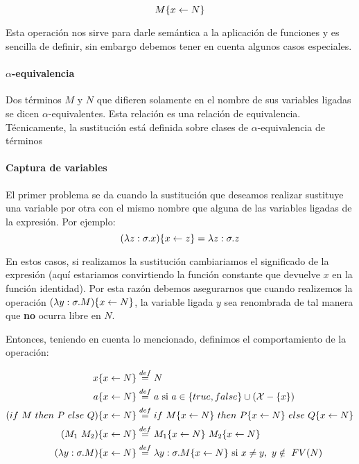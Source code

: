$$M\{x\leftarrow N\}$$

Esta operación nos sirve para darle semántica a la aplicación de funciones y es sencilla de definir, sin embargo debemos tener en cuenta algunos casos especiales.

\paragraph{$\alpha$-equivalencia} Dos términos $M$ y $N$ que difieren solamente en el nombre de sus variables ligadas se dicen $\alpha$-equivalentes. Esta relación es una relación de equivalencia. Técnicamente, la sustitución está definida sobre clases de $\alpha$-equivalencia de términos


\paragraph{Captura de variables}\label{calculo_lambda:captura_variables} El primer problema se da cuando la sustitución que deseamos realizar sustituye una variable por otra con el mismo nombre que alguna de las variables ligadas de la expresión. Por ejemplo:
$$(\lambda z: \sigma . x)\{x\leftarrow z\} = \lambda z: \sigma . z$$

En estos casos, si realizamos la sustitución cambiariamos el significado de la expresión (aquí estariamos convirtiendo la función constante que devuelve $x$ en la función identidad). Por esta razón debemos asegurarnos que cuando realizemos la operación $(\lambda y: \sigma . M)\{x\leftarrow N\}$, la variable ligada $y$ sea renombrada de tal manera que \textbf{no} ocurra libre en $N$.

\vspace*{5mm}
Entonces, teniendo en cuenta lo mencionado, definimos el comportamiento de la operación:

\begin{equation*}
	\begin{split}
		x\{x\leftarrow N\} &\overset{def}{=} N \\
		a\{x\leftarrow N\} &\overset{def}{=} a \text{ si } a \in \{true,false\}\cup(\mathcal{X}-\{x\}) \\
		(if~ M~ then~ P~ else~ Q)\{x\leftarrow N\} &\overset{def}{=} if~ M\{x\leftarrow N\}~ then~ P\{x\leftarrow N\}~ else~ Q\{x\leftarrow N\}\\
		(M_1~M_2)\{x\leftarrow N\} &\overset{def}{=} M_1\{x\leftarrow N\}~M_2\{x\leftarrow N\}\\
		(\lambda y: \sigma . M)\{x\leftarrow N\} &\overset{def}{=} \lambda y: \sigma . M\{x\leftarrow N\}~\text{si } x\neq y,~y\notin~FV(N)
	\end{split}
\end{equation*}

